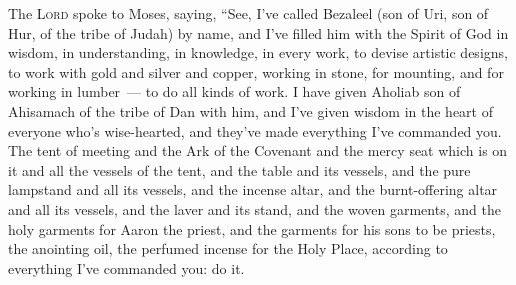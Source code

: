 
\begin{inparaenum}
   The \textsc{Lord} spoke to Moses, saying,%
   ``See, I've called Bezaleel (son of Uri, son of Hur, of the tribe of Judah) by name,%
   and I've filled him with the Spirit of God in wisdom, in understanding, in knowledge, in every work,%
   to devise artistic designs, to work with gold and silver and copper,%
   working in stone, for mounting, and for working in lumber~--- to do all kinds of work.%
   I have given Aholiab son of Ahisamach of the tribe of Dan with him, and I've given wisdom in the heart of everyone who's wise-hearted, and they've made everything I've commanded you.%
   The tent of meeting and the Ark of the Covenant and the mercy seat which is on it and all the vessels of the tent,%
   and the table and its vessels, and the pure lampstand and all its vessels, and the incense altar,%
   and the burnt-offering altar and all its vessels, and the laver and its stand,%
   and the woven garments, and the holy garments for Aaron the priest, and the garments for his sons to be priests,%
   the anointing oil, the perfumed incense for the Holy Place, according to everything I've commanded you: do it.%
  

\end{inparaenum}
